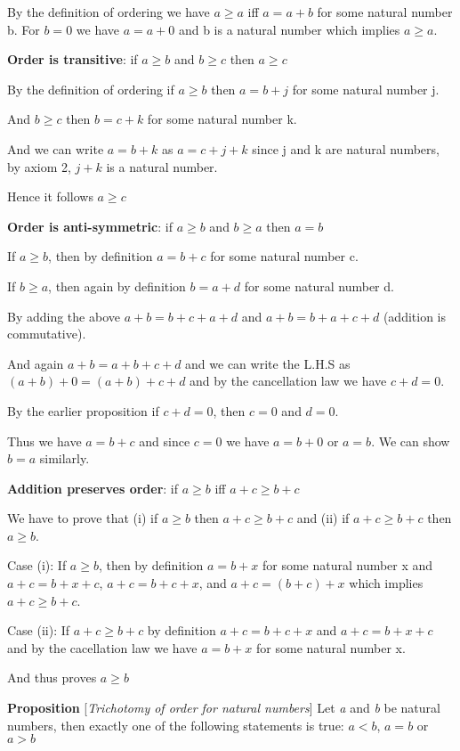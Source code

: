 \documentclass[10pt]{article}
\begin{document}
By the definition of ordering we have $a \geq a$ iff $a = a+b$ for some natural
number b. For $b=0$ we have $a= a+0$ and b is a natural number which implies $a
\geq a$.

\textbf{Order is transitive}: if $a \geq b$ and $b \geq c$ then $a \geq c$

By the definition of ordering if $a \geq b$ then $a=b+j$ for some natural number
j.

And $b \geq c$ then $b=c+k$ for some natural number k.

And we can write $a=b+k$ as $a=c+j+k$ since j and k are natural numbers, by
axiom 2, $j+k$ is a natural number.

Hence it follows $a \geq c$

\textbf{Order is anti-symmetric}: if $a \geq b$ and $b \geq a$ then $a=b$

If $a \geq b$, then by definition $a = b+c$ for some natural number c.

If $b \geq a$, then again by definition $b=a+d$ for some natural number d.

By adding the above $a+b = b+c+a+d$ and $a+b = b+a+c+d$ (addition is
commutative).

And again $a+b=a+b+c+d$ and we can write the L.H.S as $(a+b)+0 = (a+b)+c+d$ and
by the cancellation law we have $c+d=0$.

By the earlier proposition if $c+d=0$, then $c=0$ and $d=0$.

Thus we have $a=b+c$ and since $c=0$ we have $a=b+0$ or $a=b$. We can show $b=a$
similarly.

\textbf{Addition preserves order}: if $a \geq b$ iff $a+c \geq b+c$

We have to prove that (i) if $a \geq b$ then $a+c \geq b+c$ and (ii) if $a+c
\geq b+c$ then $a \geq b$.

Case (i): If $a \geq b$, then by definition $a=b+x$ for some natural number x
and $a+c = b+x+c$, $a+c = b+c+x$, and $a+c = (b+c)+x$ which implies $a+c \geq
b+c$.

Case (ii): If $a+c \geq b+c$ by definition $a+c = b+c+x$ and $a+c = b+x+c$ and
by the cacellation law we have $a = b+x$ for some natural number x.

And thus proves $a \geq b$ 

\flushleft
\newpage
\textbf{Proposition} [\emph{Trichotomy of order for natural numbers}]
Let {\em a} and {\em b} be natural numbers, then exactly one of the following
statements is true: $a < b$, $a = b$ or $a > b$
\end{document}
